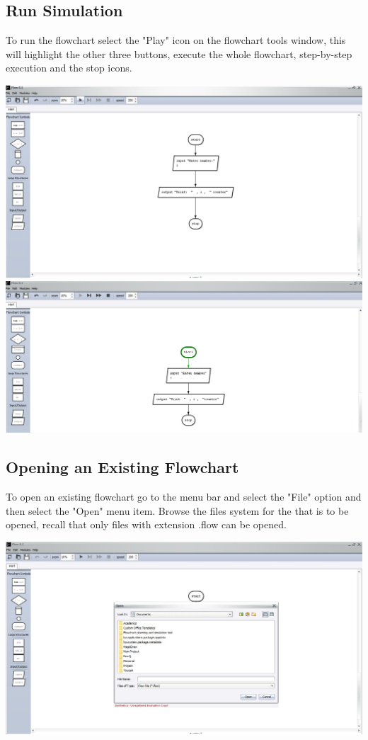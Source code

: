 \documentclass[11pt,a4paper,titlepage]{article}
\begin{document}
	\subsection{Run Simulation}
	To run the flowchart select the "Play" icon on the flowchart tools window, this will highlight the other three buttons, execute the whole flowchart, step-by-step execution and the stop icons.
	
	\includegraphics[width=14cm]{images/runSimulator.jpg}\newline\newline
	\includegraphics[width=14cm]{images/runSimulator2.jpg}
		
	\subsection{Opening an Existing Flowchart}
	
	To open an existing flowchart go to the menu bar and select the "File" option and then select the "Open" menu item. Browse the files system for the that is to be opened, recall that only files with extension .flow can be opened. \newline
	
	\includegraphics[width=14cm]{images/openFlowchart.jpg}
	
\end{document}
